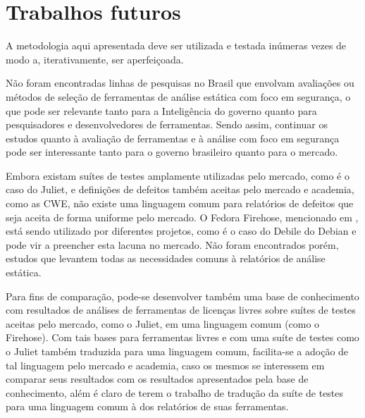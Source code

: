 \section{Trabalhos futuros}

A metodologia aqui apresentada deve ser utilizada e testada inúmeras vezes de modo a, iterativamente, ser aperfeiçoada.

Não foram encontradas linhas de pesquisas no Brasil que envolvam avaliações ou métodos de seleção de ferramentas de análise estática com foco em segurança, o que pode ser relevante tanto para a Inteligência do governo quanto para pesquisadores e desenvolvedores de ferramentas. Sendo assim, continuar os estudos quanto à avaliação de ferramentas e à análise com foco em segurança pode ser interessante tanto para o governo brasileiro quanto para o mercado.

Embora existam suítes de testes amplamente utilizadas pelo mercado, como é o caso do Juliet, e definições de defeitos também aceitas pelo mercado e academia, como as CWE, não existe uma linguagem comum para relatórios de defeitos que seja aceita de forma uniforme pelo mercado. O Fedora Firehose, mencionado em , está sendo utilizado por diferentes projetos, como é o caso do Debile do Debian e pode vir a preencher esta lacuna no mercado. Não foram encontrados porém, estudos que levantem todas as necessidades comuns à relatórios de análise estática.

Para fins de comparação, pode-se desenvolver também uma base de conhecimento com resultados de análises de  ferramentas de licenças livres sobre suítes de testes aceitas pelo mercado, como o Juliet, em uma linguagem comum (como o Firehose). Com tais bases para ferramentas livres e com uma suíte de testes como o Juliet também traduzida para uma linguagem comum, facilita-se a adoção de tal linguagem pelo mercado e academia, caso os mesmos se interessem em comparar seus resultados com os resultados apresentados pela base de conhecimento, além é claro de terem o trabalho de tradução da suíte de testes para uma linguagem comum à dos relatórios de suas ferramentas.

